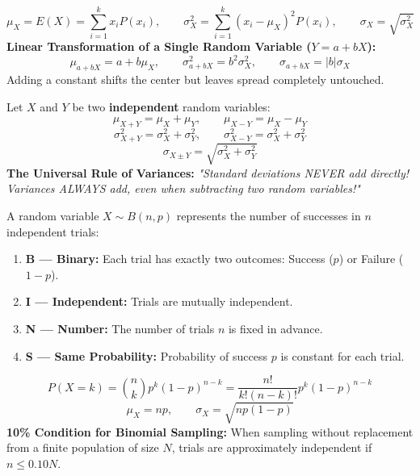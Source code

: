 \begin{lessonbox}
\begin{equation}
  \mu_X = E(X) = \sum_{i=1}^k x_i P(x_i), \qquad \sigma_X^2 = \sum_{i=1}^k (x_i - \mu_X)^2 P(x_i), \qquad \sigma_X = \sqrt{\sigma_X^2}
\end{equation}
\textbf{Linear Transformation of a Single Random Variable ($Y = a + bX$):}
\begin{equation}
  \mu_{a + bX} = a + b\mu_X, \qquad \sigma_{a + bX}^2 = b^2 \sigma_X^2, \qquad \sigma_{a + bX} = |b|\sigma_X
\end{equation}
Adding a constant shifts the center but leaves spread completely untouched.
\end{lessonbox}

\begin{lessonbox}
Let $X$ and $Y$ be two \textbf{independent} random variables:
\begin{equation}
  \mu_{X + Y} = \mu_X + \mu_Y, \qquad \mu_{X - Y} = \mu_X - \mu_Y
\end{equation}
\begin{equation}
  \sigma_{X + Y}^2 = \sigma_X^2 + \sigma_Y^2, \qquad \sigma_{X - Y}^2 = \sigma_X^2 + \sigma_Y^2
\end{equation}
\begin{equation}
  \sigma_{X \pm Y} = \sqrt{\sigma_X^2 + \sigma_Y^2}
\end{equation}
\textbf{The Universal Rule of Variances:} \textit{"Standard deviations NEVER add directly! Variances ALWAYS add, even when subtracting two random variables!"}
\end{lessonbox}

\begin{lessonbox}
A random variable $X \sim B(n, p)$ represents the number of successes in $n$ independent trials:
\begin{enumerate}[leftmargin=1.5em]
  \item \textbf{B --- Binary:} Each trial has exactly two outcomes: Success ($p$) or Failure ($1-p$).
  \item \textbf{I --- Independent:} Trials are mutually independent.
  \item \textbf{N --- Number:} The number of trials $n$ is fixed in advance.
  \item \textbf{S --- Same Probability:} Probability of success $p$ is constant for each trial.
\end{enumerate}
\begin{equation}
  P(X = k) = \binom{n}{k} p^k (1-p)^{n-k} = \frac{n!}{k!(n-k)!} p^k (1-p)^{n-k}
\end{equation}
\begin{equation}
  \mu_X = np, \qquad \sigma_X = \sqrt{np(1-p)}
\end{equation}
\textbf{10\% Condition for Binomial Sampling:} When sampling without replacement from a finite population of size $N$, trials are approximately independent if $n \le 0.10N$.
\end{lessonbox}

